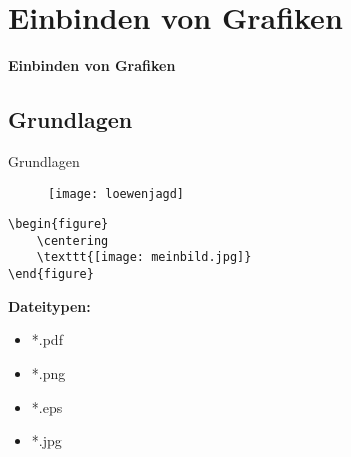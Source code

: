 \section{Einbinden von Grafiken}
\begin{frame}[c]
	\begin{center}
		\LARGE \textbf{Einbinden von Grafiken}
	\end{center}
\end{frame}
\subsection{Grundlagen}
\begin{frame}[c]
	\begin{center}
		\large Grundlagen
	\end{center}
\end{frame}
\begin{frame}[fragile]
	\Ausgabe
	\begin{outputbox}
		\begin{figure}
			\centering
			\texttt{[image: loewenjagd]}
		\end{figure}
	\end{outputbox}

	\pause\Code
	\begin{lstlisting}
\begin{figure}
	\centering
	\texttt{[image: meinbild.jpg]}
\end{figure}
	\end{lstlisting}

	\pause\textbf{Dateitypen:}\vspace{-0.2cm}
	\begin{itemize}
		\item *.pdf
		\item *.png
		\item *.eps
		\item *.jpg
	\end{itemize}
\end{frame}
